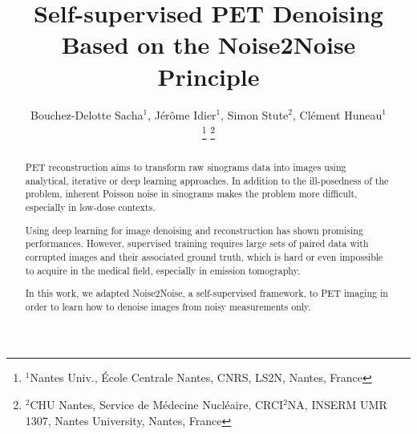 \documentclass{IEEEtran}
\begin{document}
\title{Self-supervised PET Denoising Based on the Noise2Noise Principle}
\author{Bouchez-Delotte Sacha$^{1}$, Jérôme Idier$^{1}$, Simon Stute$^{2}$, Clément Huneau$^{1}$

\thanks{$^{1}$Nantes Univ., École Centrale Nantes, CNRS, LS2N, %
Nantes, France
      }%
\thanks{$^{2}$CHU Nantes, Service de Médecine Nucléaire, CRCI$^2$NA, INSERM UMR 1307, Nantes University,%
Nantes, France
      }%
}

\maketitle
\begin{abstract}
PET reconstruction aims to transform raw sinograms data into images using analytical, iterative or deep learning approaches. In addition to the ill-posedness of the problem, inherent Poisson noise in sinograms makes the problem more difficult, especially in low-dose contexts.

Using deep learning for image denoising and reconstruction has shown promising performances. However, supervised training requires large sets of paired data with corrupted images and their associated ground truth, which is hard or even impossible to acquire in the medical field, especially in emission tomography.

In this work, we adapted Noise2Noise, a self-supervised framework, to PET imaging in order to learn how to denoise images from noisy measurements only.

\end{abstract}
\end{document}
